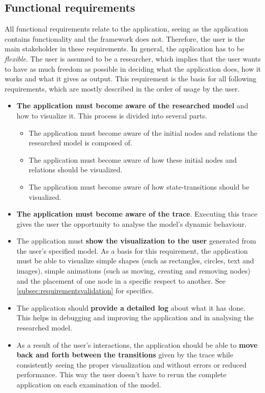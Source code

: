 \documentclass[a4paper]{article}
\begin{document}
\subsection{Functional requirements}\label{functionalrequirements}
All functional requirements relate to the application, seeing as the application contains functionality and the framework does not. Therefore, the user is the main stakeholder in these requirements. In general, the application has to be \emph{flexible}. The user is assumed to be a researcher, which implies that the user wants to have as much freedom as possible in deciding what the application does, how it works and what it gives as output. This requirement is the basis for all following requirements, which are mostly described in the order of usage by the user.
\begin{itemize}
\item \textbf{The application must become aware of the researched model} and how to visualize it. This process is divided into several parts.
	\begin{itemize}
    \item The application must become aware of the initial nodes and relations the researched model is composed of.
    \item The application must become aware of how these initial nodes and relations should be visualized.
    \item The application must become aware of how state-transitions should be visualized.
	\end{itemize}
\item \textbf{The application must become aware of the trace}. Executing this trace gives the user the opportunity to analyse the model's dynamic behaviour.
\item The application must \textbf{show the visualization to the user} generated from the user's specified model. As a basis for this requirement, the application must be able to visualize simple shapes (such as rectangles, circles, text and images), simple animations (such as moving, creating and removing nodes) and the placement of one node in a specific respect to another. See \cref{subsec:requirementsvalidation} for specifics.
\item The application should \textbf{provide a detailed log} about what it has done. This helps in debugging and improving the application and in analysing the researched model.
\item As a result of the user's interactions, the application should be able to \textbf{move back and forth between the transitions} given by the trace while consistently seeing the proper visualization and without errors or reduced performance. This way the user doesn't have to rerun the complete application on each examination of the model.
\end{itemize}
\end{document}
